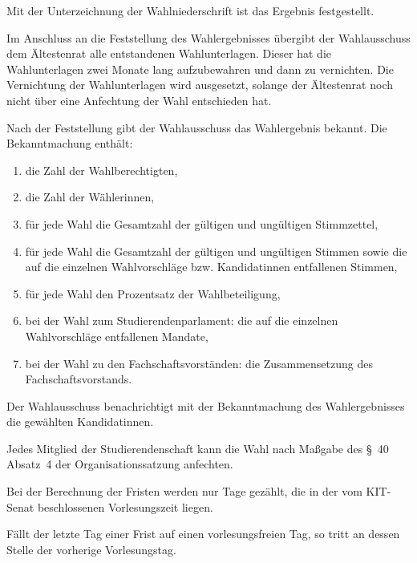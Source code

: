 \begin{jurdoc}
Mit der Unterzeichnung der Wahlniederschrift ist das Ergebnis festgestellt.

Im Anschluss an die Feststellung des Wahlergebnisses übergibt der Wahlausschuss dem Ältestenrat alle entstandenen Wahlunterlagen. Dieser hat die Wahlunterlagen zwei Monate lang aufzubewahren und dann zu vernichten. Die Vernichtung der Wahlunterlagen wird ausgesetzt, solange der Ältestenrat noch nicht über eine Anfechtung der Wahl entschieden hat.

\label{wahl:ergebnis}
Nach der Feststellung gibt der Wahlausschuss das Wahlergebnis bekannt. Die Bekanntmachung enthält:
\begin{enumerate}
    \item die Zahl der Wahlberechtigten,
    \item die Zahl der Wählerinnen,
    \item für jede Wahl die Gesamtzahl der gültigen und ungültigen Stimmzettel,
    \item für jede Wahl die Gesamtzahl der gültigen und ungültigen Stimmen sowie die auf die einzelnen Wahlvorschläge bzw. Kandidatinnen entfallenen Stimmen,
    \item für jede Wahl den Prozentsatz der Wahlbeteiligung,
    \item bei der Wahl zum Studierendenparlament: die auf die einzelnen Wahlvorschläge entfallenen Mandate,
    \item bei der Wahl zu den Fachschaftsvorständen: die Zusammensetzung des Fachschaftsvorstands.
\end{enumerate}

Der Wahlausschuss benachrichtigt mit der Bekanntmachung des Wahlergebnisses die gewählten Kandidatinnen.

\label{wahl:wahlanfechtung}
Jedes Mitglied der Studierendenschaft kann die Wahl nach Maßgabe des §~40 Absatz~4 der Organisationssatzung anfechten.

\label{wahl:fristen}
Bei der Berechnung der Fristen werden nur Tage gezählt, die in der vom KIT-Senat beschlossenen Vorlesungszeit liegen.

Fällt der letzte Tag einer Frist auf einen vorlesungsfreien Tag, so tritt an dessen Stelle der vorherige Vorlesungstag.

\end{jurdoc}
